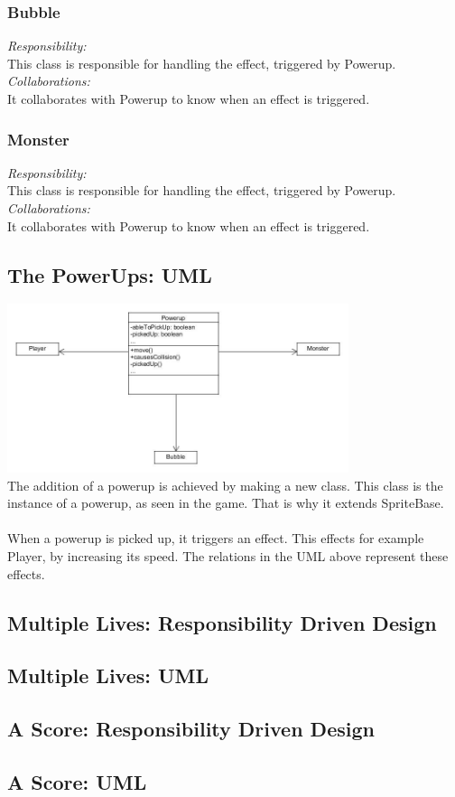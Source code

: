 \subsubsection{Bubble}
\textit{Responsibility:} \\
This class is responsible for handling the effect, triggered by Powerup. \\
\textit{Collaborations:} \\
It collaborates with Powerup to know when an effect is triggered. 

\subsubsection{Monster}
\textit{Responsibility:} \\
This class is responsible for handling the effect, triggered by Powerup. \\
\textit{Collaborations:} \\
It collaborates with Powerup to know when an effect is triggered. \\

\subsection{The PowerUps: UML}
\includegraphics[width=100mm]{uml_powerups.jpg}\\[1cm]
The addition of a powerup is achieved by making a new class. This class is the instance of a powerup, as seen in the game. That is why it extends SpriteBase. 
\\\\
When a powerup is picked up, it triggers an effect. This effects for example Player, by increasing its speed. The relations in the UML above represent these effects.


\subsection{Multiple Lives: Responsibility Driven Design}
\subsection{Multiple Lives: UML}
\subsection{A Score: Responsibility Driven Design}
\subsection{A Score: UML}
